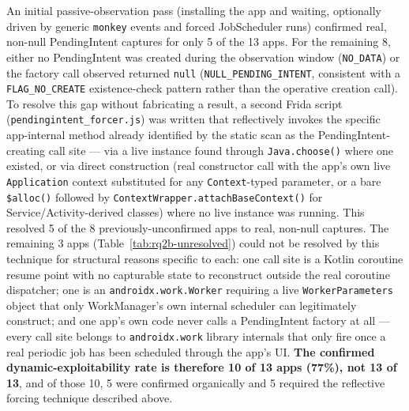 An initial passive-observation pass (installing the app and waiting, optionally driven
by generic \texttt{monkey} events and forced JobScheduler runs) confirmed real,
non-null PendingIntent captures for only 5 of the 13 apps. For the remaining 8, either
no PendingIntent was created during the observation window (\texttt{NO\_DATA}) or the
factory call observed returned \texttt{null} (\texttt{NULL\_PENDING\_INTENT}, consistent
with a \texttt{FLAG\_NO\_CREATE} existence-check pattern rather than the operative
creation call). To resolve this gap without fabricating a result, a second Frida script
(\texttt{pendingintent\_forcer.js}) was written that reflectively invokes the specific
app-internal method already identified by the static scan as the PendingIntent-creating
call site — via a live instance found through \texttt{Java.choose()} where one existed,
or via direct construction (real constructor call with the app's own live
\texttt{Application} context substituted for any \texttt{Context}-typed parameter, or a
bare \texttt{\$alloc()} followed by \texttt{ContextWrapper.attachBaseContext()} for
Service/Activity-derived classes) where no live instance was running. This resolved 5 of
the 8 previously-unconfirmed apps to real, non-null captures. The remaining 3 apps
(Table~\ref{tab:rq2b-unresolved}) could not be resolved by this technique for
structural reasons specific to each: one call site is a Kotlin coroutine resume point
with no capturable state to reconstruct outside the real coroutine dispatcher; one is an
\texttt{androidx.work.Worker} requiring a live \texttt{WorkerParameters} object that only
WorkManager's own internal scheduler can legitimately construct; and one app's own code
never calls a PendingIntent factory at all — every call site belongs to
\texttt{androidx.work} library internals that only fire once a real periodic job has
been scheduled through the app's UI. \textbf{The confirmed dynamic-exploitability rate
is therefore 10 of 13 apps (77\%), not 13 of 13}, and of those 10, 5 were confirmed
organically and 5 required the reflective forcing technique described above.

